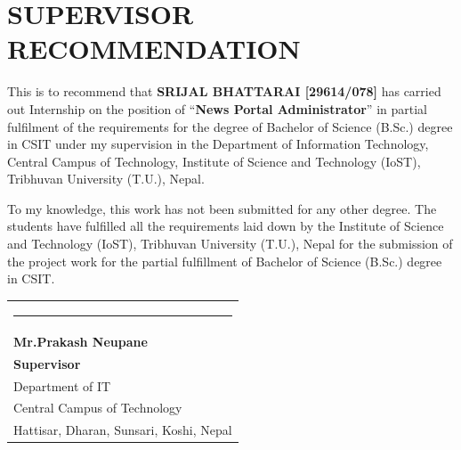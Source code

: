 \section*{\centering \Large \textbf{SUPERVISOR RECOMMENDATION}}
\sloppy

This is to recommend that \textbf{SRIJAL BHATTARAI [29614/078]} has carried out Internship on the position of ``\textbf{News Portal Administrator}'' in partial fulfilment of the requirements for the degree of Bachelor of Science (B.Sc.) degree in CSIT under my supervision in the Department of Information Technology, Central Campus of Technology, Institute of Science and Technology (IoST), Tribhuvan University (T.U.), Nepal.

\vspace{1em}

To my knowledge, this work has not been submitted for any other degree. The students have fulfilled all the requirements laid down by the Institute of Science and Technology (IoST), Tribhuvan University (T.U.), Nepal for the submission of the project work for the partial fulfillment of Bachelor of Science (B.Sc.) degree in CSIT.

\begin{flushleft}
\begin{tabular}{@{}l@{}}
    \rule{4cm}{0.4pt} \\
    \textbf{Mr.\@ Prakash Neupane} \\
    \textbf{Supervisor} \\
    Department of IT \\
    Central Campus of Technology \\
    Hattisar, Dharan, Sunsari, Koshi, Nepal \\
\end{tabular}
\end{flushleft}

\newpage